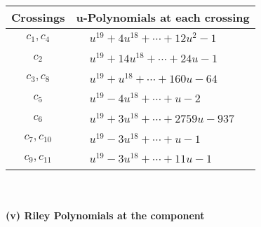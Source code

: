 \documentclass[1p]{elsarticle_modified}
\theoremstyle{definition}
\begin{document}
\begin{tabular}{m{50pt}|m{274pt}}
Crossings & \hspace{64pt}u-Polynomials at each crossing \\
\hline $$\begin{aligned}c_{1},c_{4}\end{aligned}$$&$\begin{aligned}
&u^{19}+4 u^{18}+\cdots+12 u^2-1
\end{aligned}$\\
\hline $$\begin{aligned}c_{2}\end{aligned}$$&$\begin{aligned}
&u^{19}+14 u^{18}+\cdots+24 u-1
\end{aligned}$\\
\hline $$\begin{aligned}c_{3},c_{8}\end{aligned}$$&$\begin{aligned}
&u^{19}+u^{18}+\cdots+160 u-64
\end{aligned}$\\
\hline $$\begin{aligned}c_{5}\end{aligned}$$&$\begin{aligned}
&u^{19}-4 u^{18}+\cdots+u-2
\end{aligned}$\\
\hline $$\begin{aligned}c_{6}\end{aligned}$$&$\begin{aligned}
&u^{19}+3 u^{18}+\cdots+2759 u-937
\end{aligned}$\\
\hline $$\begin{aligned}c_{7},c_{10}\end{aligned}$$&$\begin{aligned}
&u^{19}-3 u^{18}+\cdots+u-1
\end{aligned}$\\
\hline $$\begin{aligned}c_{9},c_{11}\end{aligned}$$&$\begin{aligned}
&u^{19}-3 u^{18}+\cdots+11 u-1
\end{aligned}$\\
\hline
\end{tabular}\\~\\
\newpage\renewcommand{\arraystretch}{1}
\flushleft \textbf{(v) Riley Polynomials at the component}\newline \\
\end{document}
